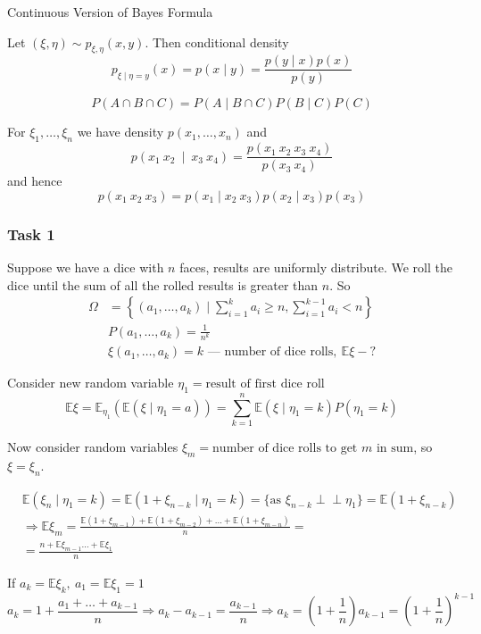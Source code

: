\documentclass[fullscreen=true, bookmarks=true, hyperref={pdfencoding=unicode}]{beamer}
\newcommand{\indep}{\perp \!\!\! \perp}
\begin{document}
\begin{frame}{Continuous Version of Bayes Formula}
  \begin{definition}
    Let $(\xi, \eta) \sim p_{\xi, \eta}(x, y)$. Then conditional density
    \[
      p_{\xi \mid \eta = y} (x) = p(x\mid y) = \frac{p(y\mid x)p(x)}{p(y)}
    \]
  \end{definition}

\end{frame}


\begin{frame}
  \[
    P(A \cap B \cap C) = P(A \mid B \cap C) P(B \mid C) P(C)
  \]

  \vspace{1cm}
  For $\xi_1, \dots, \xi_n$ we have density $p(x_1, \dots, x_n)$ and
  \[
    p(x_1\ x_2\ \mid\ x_3\ x_4) = \frac{p(x_1\ x_2\ x_3\ x_4)}{p(x_3\ x_4)}
  \]
  and hence
  \[
    p(x_1\ x_2\ x_3) = p(x_1\mid x_2\ x_3) p(x_2\mid x_3) p(x_3)
  \]
\end{frame}


\begin{frame}
  \frametitle{Task 1}
   Suppose we have a dice with $n$ faces, results are uniformly distribute.
   We roll the dice until the sum of all the rolled results is greater than $n$. So
   \begin{align*}
    \Omega &= \left\{ (a_1, \dots, a_k) \mid \sum\limits_{i=1}^k a_i \geq n, \sum\limits_{i=1}^{k-1} a_i < n \right\} \\
    &P(a_1, \dots, a_k) = \frac{1}{n^k} \\
    &\xi(a_1, \dots, a_k) = k \text{ — number of dice rolls},\ \mathbb{E}\xi - ?
   \end{align*}
   
   \pause
   Consider new random variable $\eta_1 = \text{result of first dice roll}$
   \[
    \mathbb{E}\xi = \mathbb{E}_{\eta_1} \left(\mathbb{E}(\xi\mid \eta_1=a)\right) =
    \sum\limits_{k=1}^n \mathbb{E}(\xi\mid \eta_1=k) P(\eta_1 = k)
   \]

   \pause
   Now consider random variables $\xi_m = \text{number of dice rolls to get $m$ in sum}$, so $\xi = \xi_n$.
\end{frame}


\begin{frame}
  \begin{align*}
    &\mathbb{E}(\xi_n\mid \eta_1=k) = \mathbb{E}(1+\xi_{n-k}\mid \eta_1=k) =
    \{\text{as } \xi_{n-k} \indep \eta_1 \} = \mathbb{E}(1 + \xi_{n-k}) \\
    &\Rightarrow \mathbb{E}\xi_m = \frac{\mathbb{E}(1 + \xi_{m-1}) + \mathbb{E}(1 + \xi_{m-2}) + \dots + \mathbb{E}(1 + \xi_{m-n})}{n} =\\
    &= \frac{n + \mathbb{E}\xi_{m-1} \dots + \mathbb{E}\xi_{1}}{n}
  \end{align*}

  \pause
  If $a_k = \mathbb{E}\xi_k,\ a_1 = \mathbb{E}\xi_1 = 1$
  \[
    a_k = 1 + \frac{a_1 + \dots + a_{k-1}}{n} 
    \Rightarrow a_k - a_{k-1} = \frac{a_{k-1}}{n}
    \Rightarrow a_k = \left(1 + \frac{1}{n}\right) a_{k-1} = \left(1 + \frac{1}{n}\right)^{k-1}
  \]
\end{frame}
\end{document}
